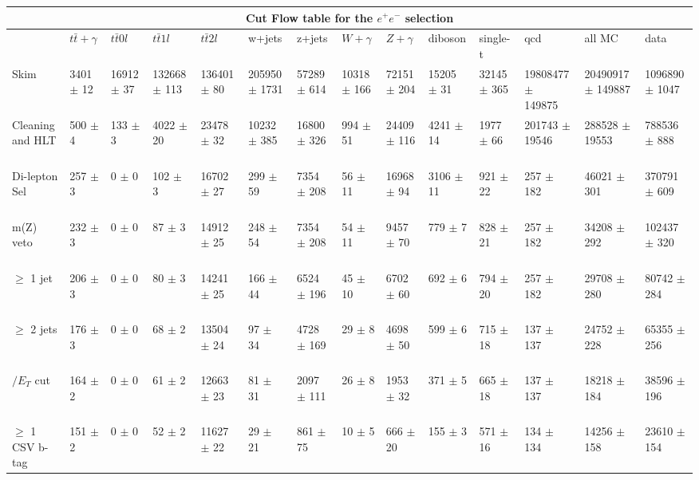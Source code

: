 \begin{table}
{\begin{tabular}{|l|l|l|l|l|l|l|l|l|l|l|l|l|l|}
\hline
\multicolumn{14}{|c|}{\textbf{Cut Flow table for the $e^+e^-$ selection}} \\
\hline
 & $t\bar{t}+\gamma$ & $t\bar{t} 0l$ & $t\bar{t} 1l$ & $t\bar{t} 2l$ & w+jets & z+jets & $W+\gamma$ & $Z+\gamma$ & diboson & single-t & qcd & all MC & data\\
 \hline
Skim & 3401 $\pm$ 12 \ & 16912 $\pm$ 37 \ & 132668 $\pm$ 113 \ & 136401 $\pm$ 80 \ & 205950 $\pm$ 1731 \ & 57289 $\pm$ 614 \ & 10318 $\pm$ 166 \ & 72151 $\pm$ 204 \ & 15205 $\pm$ 31 \ & 32145 $\pm$ 365 \ & 19808477 $\pm$ 149875\ & 20490917 $\pm$ 149887 \ & 1096890 $\pm$ 1047 \\
Cleaning and HLT & 500 $\pm$ 4 \ & 133 $\pm$ 3 \ & 4022 $\pm$ 20 \ & 23478 $\pm$ 32 \ & 10232 $\pm$ 385 \ & 16800 $\pm$ 326 \ & 994 $\pm$ 51 \ & 24409 $\pm$ 116 \ & 4241 $\pm$ 14 \ & 1977 $\pm$ 66 \ & 201743 $\pm$ 19546\ & 288528 $\pm$ 19553 \ & 788536 $\pm$ 888 \\
Di-lepton Sel & 257 $\pm$ 3 \ & 0 $\pm$ 0 \ & 102 $\pm$ 3 \ & 16702 $\pm$ 27 \ & 299 $\pm$ 59 \ & 7354 $\pm$ 208 \ & 56 $\pm$ 11 \ & 16968 $\pm$ 94 \ & 3106 $\pm$ 11 \ & 921 $\pm$ 22 \ & 257 $\pm$ 182\ & 46021 $\pm$ 301 \ & 370791 $\pm$ 609 \\
m(Z) veto & 232 $\pm$ 3 \ & 0 $\pm$ 0 \ & 87 $\pm$ 3 \ & 14912 $\pm$ 25 \ & 248 $\pm$ 54 \ & 7354 $\pm$ 208 \ & 54 $\pm$ 11 \ & 9457 $\pm$ 70 \ & 779 $\pm$ 7 \ & 828 $\pm$ 21 \ & 257 $\pm$ 182\ & 34208 $\pm$ 292 \ & 102437 $\pm$ 320 \\
$\geq$ 1 jet & 206 $\pm$ 3 \ & 0 $\pm$ 0 \ & 80 $\pm$ 3 \ & 14241 $\pm$ 25 \ & 166 $\pm$ 44 \ & 6524 $\pm$ 196 \ & 45 $\pm$ 10 \ & 6702 $\pm$ 60 \ & 692 $\pm$ 6 \ & 794 $\pm$ 20 \ & 257 $\pm$ 182\ & 29708 $\pm$ 280 \ & 80742 $\pm$ 284 \\
$\geq$ 2 jets & 176 $\pm$ 3 \ & 0 $\pm$ 0 \ & 68 $\pm$ 2 \ & 13504 $\pm$ 24 \ & 97 $\pm$ 34 \ & 4728 $\pm$ 169 \ & 29 $\pm$ 8 \ & 4698 $\pm$ 50 \ & 599 $\pm$ 6 \ & 715 $\pm$ 18 \ & 137 $\pm$ 137\ & 24752 $\pm$ 228 \ & 65355 $\pm$ 256 \\
$\slash{E_{T}}$ cut & 164 $\pm$ 2 \ & 0 $\pm$ 0 \ & 61 $\pm$ 2 \ & 12663 $\pm$ 23 \ & 81 $\pm$ 31 \ & 2097 $\pm$ 111 \ & 26 $\pm$ 8 \ & 1953 $\pm$ 32 \ & 371 $\pm$ 5 \ & 665 $\pm$ 18 \ & 137 $\pm$ 137\ & 18218 $\pm$ 184 \ & 38596 $\pm$ 196 \\
$\geq$ 1 CSV b-tag & 151 $\pm$ 2 \ & 0 $\pm$ 0 \ & 52 $\pm$ 2 \ & 11627 $\pm$ 22 \ & 29 $\pm$ 21 \ & 861 $\pm$ 75 \ & 10 $\pm$ 5 \ & 666 $\pm$ 20 \ & 155 $\pm$ 3 \ & 571 $\pm$ 16 \ & 134 $\pm$ 134\ & 14256 $\pm$ 158 \ & 23610 $\pm$ 154 \\

\end{tabular}}
\end{table}
